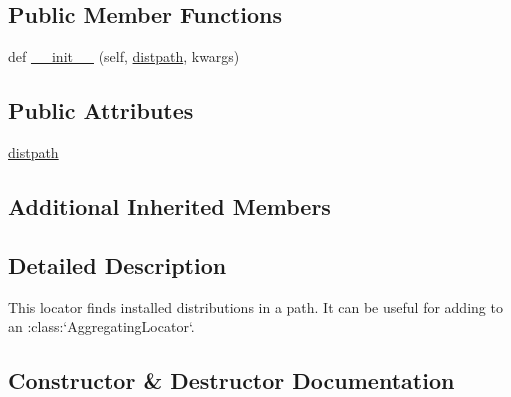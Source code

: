 \subsection*{Public Member Functions}
\begin{DoxyCompactItemize}
\item 
def \hyperlink{classpip_1_1__vendor_1_1distlib_1_1locators_1_1DistPathLocator_af440bbbdfe75fd518a22ef625bc0b8b1}{\+\_\+\+\_\+init\+\_\+\+\_\+} (self, \hyperlink{classpip_1_1__vendor_1_1distlib_1_1locators_1_1DistPathLocator_adb796d43f555abed005db6c8e4b798ae}{distpath}, kwargs)
\end{DoxyCompactItemize}
\subsection*{Public Attributes}
\begin{DoxyCompactItemize}
\item 
\hyperlink{classpip_1_1__vendor_1_1distlib_1_1locators_1_1DistPathLocator_adb796d43f555abed005db6c8e4b798ae}{distpath}
\end{DoxyCompactItemize}
\subsection*{Additional Inherited Members}


\subsection{Detailed Description}
\begin{DoxyVerb}This locator finds installed distributions in a path. It can be useful for
adding to an :class:`AggregatingLocator`.
\end{DoxyVerb}
 

\subsection{Constructor \& Destructor Documentation}
\mbox{\label{classpip_1_1__vendor_1_1distlib_1_1locators_1_1DistPathLocator_af440bbbdfe75fd518a22ef625bc0b8b1}} 
